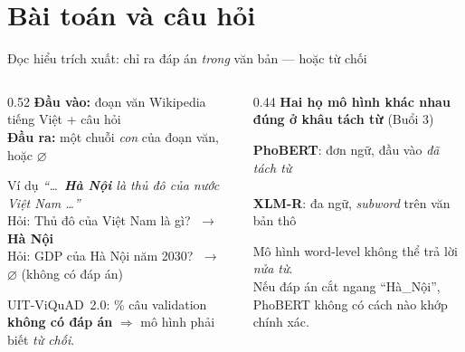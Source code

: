 \section{Bài toán và câu hỏi}

\begin{frame}{Đọc hiểu trích xuất: chỉ ra đáp án \emph{trong} văn bản --- hoặc từ chối}
\begin{columns}[T]
\begin{column}{0.52\textwidth}
\small
\textbf{Đầu vào:} đoạn văn Wikipedia tiếng Việt + câu hỏi\\
\textbf{Đầu ra:} một chuỗi \emph{con} của đoạn văn, hoặc $\varnothing$

\vspace{0.6em}
\begin{block}{Ví dụ}
\footnotesize \emph{``\dots\ \textcolor{phobert}{\textbf{Hà Nội}} là thủ đô của nước Việt Nam \dots''}\\[2pt]
Hỏi: Thủ đô của Việt Nam là gì? $\;\to\;$ \textbf{Hà Nội}\\
Hỏi: GDP của Hà Nội năm 2030? $\;\to\;$ $\varnothing$ \textcolor{muted}{(không có đáp án)}
\end{block}

\vspace{0.4em}
UIT-ViQuAD~2.0: \PctValImp\% câu validation \textbf{không có đáp án} $\Rightarrow$ mô hình phải biết \emph{từ chối}.
\end{column}
\begin{column}{0.44\textwidth}
\small
\textbf{Hai họ mô hình khác nhau đúng ở khâu tách từ} (Buổi 3)
\vspace{0.4em}

\textcolor{phobert}{\textbf{PhoBERT}}: đơn ngữ, đầu vào \emph{đã tách từ}\\
\\[4pt]
\textcolor{xlmr}{\textbf{XLM-R}}: đa ngữ, \emph{subword} trên văn bản thô\\

\vspace{0.6em}
\alert{Mô hình word-level không thể trả lời \emph{nửa từ}.}\\
\footnotesize Nếu đáp án cắt ngang ``Hà\_Nội'', PhoBERT không có cách nào khớp chính xác.
\end{column}
\end{columns}
\end{frame}

